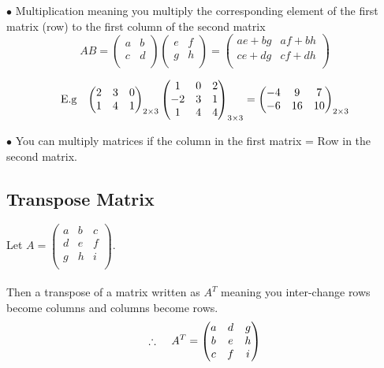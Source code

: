 \documentclass[11pt,a4paper]{article}
\begin{document}
\begin{enumerate}
$\bullet$ Multiplication meaning you multiply the corresponding element of the first matrix (row) to the first column of the second matrix
$$ AB =
\begin{pmatrix}
a & b\\
c & d\\
\end{pmatrix}
\begin{pmatrix}
e & f\\
g & h\\
\end{pmatrix}
=
\begin{pmatrix}
ae+bg & af+bh\\
ce+dg & cf+dh\\
\end{pmatrix}
$$

$$ \text{E.g}\hspace{0.3cm}
\begin{pmatrix}
2 & 3 & 0\\
1 & 4 & 1\\
\end{pmatrix}_{2\times 3}
\begin{pmatrix}
1 & 0 & 2\\
-2 & 3 & 1\\
1 & 4 & 4\\
\end{pmatrix}_{3\times 3}
=
\begin{pmatrix}
-4 & 9 & 7\\
-6 & 16 & 10\\
\end{pmatrix}_{2\times 3}
$$

$\bullet$ You can multiply matrices if the column in the first matrix = Row in the second matrix.\\
\end{enumerate}



\subsection{Transpose Matrix}
Let $A=
\begin{pmatrix}
a & b & c\\
d & e & f\\
g & h & i\\
\end{pmatrix}
$.\\\\
Then a transpose of a matrix written as $A^T$ meaning you inter-change rows become columns and columns become rows. 
$$ \therefore \hspace{0.4cm} A^T=
\begin{pmatrix}
a & d & g\\
b & e & h\\
c & f & i\\
\end{pmatrix}
$$
\end{document}
